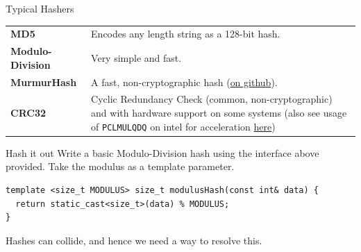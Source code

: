 \begin{sidenotebox}{Typical Hashers}
    \begin{center}
        \begin{tabular}{l p{}}
            \textbf{MD5}             & Encodes any length string as a 128-bit hash.                                                                                                                                                                                                                                                                                \\
            \textbf{Modulo-Division} & Very simple and fast.                                                                                                                                                                                                                                                                                                       \\
            \textbf{MurmurHash}      & A fast, non-cryptographic hash (\href{https://github.com/aappleby/smhasher}{on github}).                                                                                                                                                                                                                                    \\
            \textbf{CRC32}           & Cyclic Redundancy Check (common, non-cryptographic) and with hardware support on some systems (also see usage of \texttt{PCLMULQDQ} on intel for acceleration \href{https://www.intel.com/content/dam/www/public/us/en/documents/white-papers/fast-crc-computation-generic-polynomials-pclmulqdq-paper.pdf}{here})
        \end{tabular}
    \end{center}
\end{sidenotebox}

\begin{examplebox}{Hash it out}
    Write a basic Modulo-Division hash using the interface above provided. Take the modulus as a template parameter.
    \tcblower
    \begin{verbatim}
template <size_t MODULUS> size_t modulusHash(const int& data) {
  return static_cast<size_t>(data) % MODULUS;
}
    \end{verbatim}
\end{examplebox}

Hashes can collide, and hence we need a way to resolve this.

